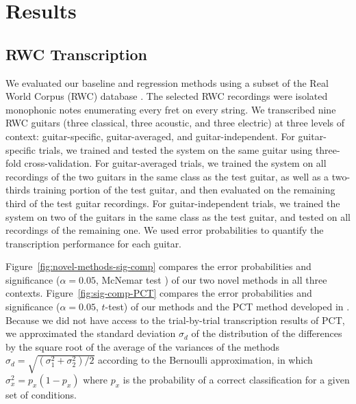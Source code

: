 \documentclass[convention,peer-reviewed]{aesconf}
\begin{document}
\section{Results}  
\subsection{RWC Transcription}
We evaluated our baseline and regression methods using a subset of the Real World Corpus (RWC) database \citep{goto2003}. The selected RWC recordings were isolated monophonic notes enumerating every fret on every string. We transcribed nine RWC guitars (three classical, three acoustic, and three electric) at three levels of context: guitar-specific, guitar-averaged, and guitar-independent. For guitar-specific trials, we trained and tested the system on the same guitar using three-fold cross-validation. For guitar-averaged trials, we trained the system on all recordings of the two guitars in the same class as the test guitar, as well as a two-thirds training portion of the test guitar, and then evaluated on the remaining third of the test guitar recordings. For guitar-independent trials, we trained the system on two of the guitars in the same class as the test guitar, and tested on all recordings of the remaining one. We used error probabilities to quantify the transcription performance for each guitar.

Figure~\ref{fig:novel-methods-sig-comp} compares the error probabilities and significance ($\alpha = 0.05$, McNemar test \citep{McNemar1947}) of our two novel methods in all three contexts. Figure~\ref{fig:sig-comp-PCT} compares the error probabilities and significance ($\alpha = 0.05$, $t$-test) of our methods and the PCT method developed in \citep{barbanchoi2012}. Because we did not have access to the trial-by-trial transcription results of PCT, we approximated the standard deviation $\sigma_d$ of the distribution of the differences by the square root of the average of the variances of the methods $\sigma_d = \sqrt{(\sigma^2_1+\sigma^2_2)/2}$ according to the Bernoulli approximation, in which $\sigma_x^2 = p_x(1-p_x)$ where $p_x$ is the probability of a correct classification for a given set of conditions.
\end{document}
